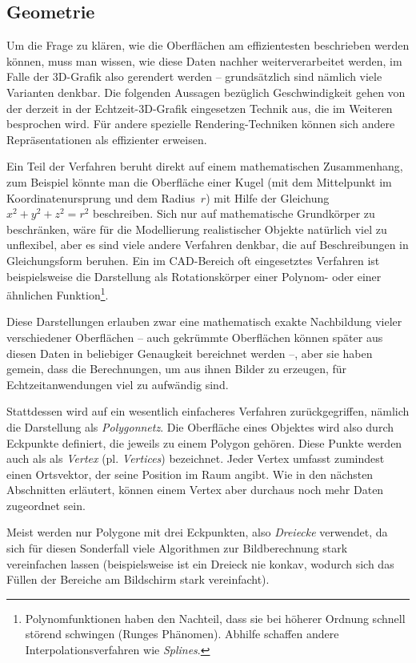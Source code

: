 \subsection{Geometrie}
\label{vertex}
Um die Frage zu klären, wie die Oberflächen am effizientesten beschrieben werden können, muss man wissen, wie diese Daten nachher weiterverarbeitet werden, im Falle der 3D-Grafik also gerendert werden -- grundsätzlich sind nämlich viele Varianten denkbar. Die folgenden Aussagen bezüglich Geschwindigkeit gehen von der derzeit in der Echtzeit-3D-Grafik eingesetzen Technik aus, die im Weiteren besprochen wird. Für andere spezielle Rendering-Techniken können sich andere Repräsentationen als effizienter erweisen.

Ein Teil der Verfahren beruht direkt auf einem mathematischen Zusammenhang, zum Beispiel könnte man die Oberfläche einer Kugel (mit dem Mittelpunkt im Koordinatenursprung und dem Radius~$r$) mit Hilfe der Gleichung $x^2 + y^2 + z^2 = r^2$ beschreiben. Sich nur auf mathematische Grundkörper zu beschränken, wäre für die Modellierung realistischer Objekte natürlich viel zu unflexibel, aber es sind viele andere Verfahren denkbar, die auf Beschreibungen in Gleichungsform beruhen. Ein im CAD-Bereich oft eingesetztes Verfahren ist beispielsweise die Darstellung als Rotationskörper einer Polynom- oder einer ähnlichen Funktion\footnote{Polynomfunktionen haben den Nachteil, dass sie bei höherer Ordnung schnell störend schwingen (Runges Phänomen). Abhilfe schaffen andere Interpolationsverfahren wie \emph{Splines}.}.

Diese Darstellungen erlauben zwar eine mathematisch exakte Nachbildung vieler verschiedener Oberflächen -- auch gekrümmte Oberflächen können später aus diesen Daten in beliebiger Genaugkeit bereichnet werden --, aber sie haben gemein, dass die Berechnungen, um aus ihnen Bilder zu erzeugen, für Echtzeitanwendungen viel zu aufwändig sind.

Stattdessen wird auf ein wesentlich einfacheres Verfahren zurückgegriffen, nämlich die Darstellung als \emph{Polygonnetz}. Die Oberfläche eines Objektes wird also durch Eckpunkte definiert, die jeweils zu einem Polygon gehören. Diese Punkte werden auch als als \emph{Vertex} (pl. \emph{Vertices}) bezeichnet. Jeder Vertex umfasst zumindest einen Ortsvektor, der seine Position im Raum angibt. Wie in den nächsten Abschnitten erläutert, können einem Vertex aber durchaus noch mehr Daten zugeordnet sein.

Meist werden nur Polygone mit drei Eckpunkten, also \emph{Dreiecke} verwendet, da sich für diesen Sonderfall viele Algorithmen zur Bildberechnung stark vereinfachen lassen (beispielsweise ist ein Dreieck nie konkav, wodurch sich das Füllen der Bereiche am Bildschirm stark vereinfacht).

